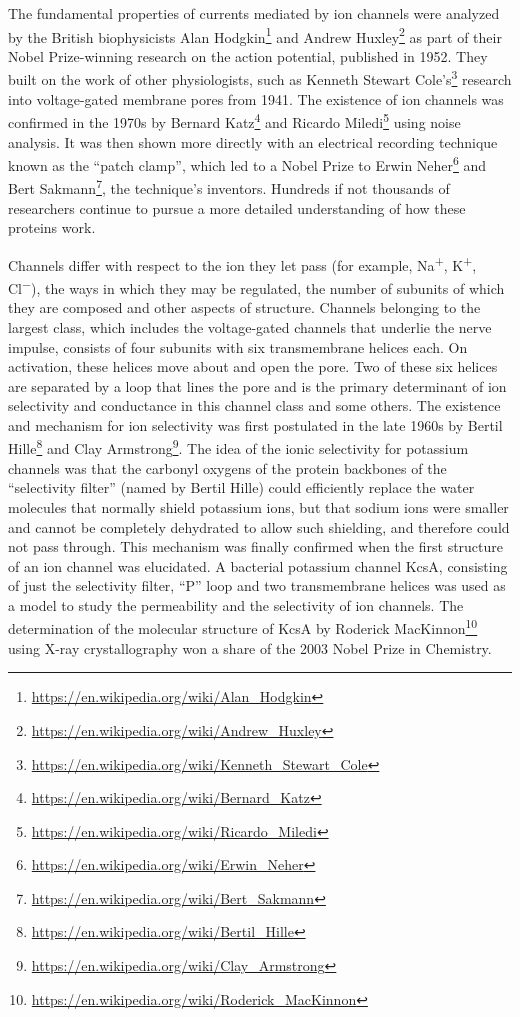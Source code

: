 \documentclass[]{book}
\let\rmarkdownfootnote\footnote%
\def\footnote{\protect\rmarkdownfootnote}
\renewcommand{\href}[2]{#2\footnote{\url{#1}}}
\begin{document}
The fundamental properties of currents mediated by ion channels were analyzed by the British biophysicists \href{https://en.wikipedia.org/wiki/Alan_Hodgkin}{Alan Hodgkin} and \href{https://en.wikipedia.org/wiki/Andrew_Huxley}{Andrew Huxley} as part of their Nobel Prize-winning research on the action potential, published in 1952. They built on the work of other physiologists, such as \href{https://en.wikipedia.org/wiki/Kenneth_Stewart_Cole}{Kenneth Stewart Cole's} research into voltage-gated membrane pores from 1941. The existence of ion channels was confirmed in the 1970s by \href{https://en.wikipedia.org/wiki/Bernard_Katz}{Bernard Katz} and \href{https://en.wikipedia.org/wiki/Ricardo_Miledi}{Ricardo Miledi} using noise analysis. It was then shown more directly with an electrical recording technique known as the ``patch clamp'', which led to a Nobel Prize to \href{https://en.wikipedia.org/wiki/Erwin_Neher}{Erwin Neher} and \href{https://en.wikipedia.org/wiki/Bert_Sakmann}{Bert Sakmann}, the technique's inventors. Hundreds if not thousands of researchers continue to pursue a more detailed understanding of how these proteins work.

Channels differ with respect to the ion they let pass (for example, Na\textsuperscript{+}, K\textsuperscript{+}, Cl\textsuperscript{−}), the ways in which they may be regulated, the number of subunits of which they are composed and other aspects of structure. Channels belonging to the largest class, which includes the voltage-gated channels that underlie the nerve impulse, consists of four subunits with six transmembrane helices each. On activation, these helices move about and open the pore. Two of these six helices are separated by a loop that lines the pore and is the primary determinant of ion selectivity and conductance in this channel class and some others. The existence and mechanism for ion selectivity was first postulated in the late 1960s by \href{https://en.wikipedia.org/wiki/Bertil_Hille}{Bertil Hille} and \href{https://en.wikipedia.org/wiki/Clay_Armstrong}{Clay Armstrong}. The idea of the ionic selectivity for potassium channels was that the carbonyl oxygens of the protein backbones of the ``selectivity filter'' (named by Bertil Hille) could efficiently replace the water molecules that normally shield potassium ions, but that sodium ions were smaller and cannot be completely dehydrated to allow such shielding, and therefore could not pass through. This mechanism was finally confirmed when the first structure of an ion channel was elucidated. A bacterial potassium channel KcsA, consisting of just the selectivity filter, ``P'' loop and two transmembrane helices was used as a model to study the permeability and the selectivity of ion channels. The determination of the molecular structure of KcsA by \href{https://en.wikipedia.org/wiki/Roderick_MacKinnon}{Roderick MacKinnon} using X-ray crystallography won a share of the 2003 Nobel Prize in Chemistry.
\end{document}
